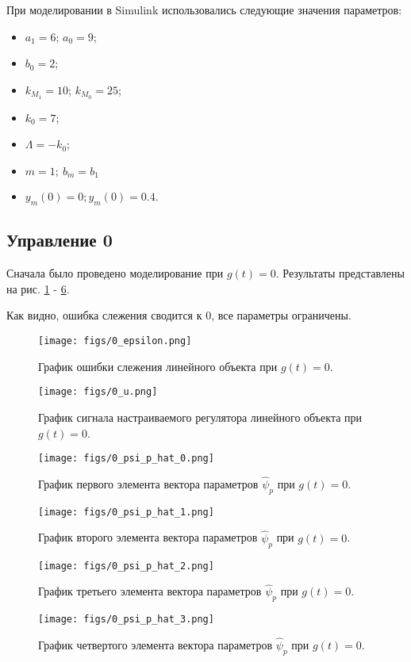 \documentclass{article}
\begin{document}
При моделировании в Simulink использовались следующие значения параметров: 
\begin{itemize}
  \item \(a_1 = 6\); \(a_0 = 9\);
  \item \(b_0 = 2\);
  \item \(k_{M_1} = 10\); \(k_{M_0} = 25\);
  \item \(k_0 = 7\);
  \item \(\Lambda = -k_0\);
  \item \(m = 1; ~ b_m = b_1\)
  \item \(y_m(0) = 0; y_m(0) = 0.4\).
\end{itemize}

\newpage
\subsection{Управление 0}
Сначала было проведено моделирование при \(g(t) = 0\). 
Результаты представлены на рис. \ref{fig:1_epsilon} - \ref{fig:1_psi0_psi_p_hat_3}.

Как видно, ошибка слежения сводится к 0, все параметры ограничены.
\begin{figure}[h!]
  \centering
  \texttt{[image: figs/0\_epsilon.png]}
  \caption{График ошибки слежения линейного объекта при \(g(t) = 0\).} 
  \label{fig:1_epsilon}
\end{figure}
\begin{figure}[h!]
  \centering
  \texttt{[image: figs/0\_u.png]}
  \caption{График сигнала настраиваемого регулятора линейного объекта при \(g(t) = 0\).} 
  \label{fig:1_u}
\end{figure}
\begin{figure}[h!]
  \centering
  \texttt{[image: figs/0\_psi\_p\_hat\_0.png]}
  \caption{График первого элемента вектора параметров \(\hat{\psi}_p\) при \(g(t) = 0\).} 
  \label{fig:1_psi0_psi_p_hat_0}
\end{figure}
\begin{figure}[h!]
  \centering
  \texttt{[image: figs/0\_psi\_p\_hat\_1.png]}
  \caption{График второго элемента вектора параметров \(\hat{\psi}_p\) при \(g(t) = 0\).} 
  \label{fig:1_psi0_psi_p_hat_1}
\end{figure}
\begin{figure}[h!]
  \centering
  \texttt{[image: figs/0\_psi\_p\_hat\_2.png]}
  \caption{График третьего элемента вектора параметров \(\hat{\psi}_p\) при \(g(t) = 0\).} 
  \label{fig:1_psi0_psi_p_hat_2}
\end{figure}
\begin{figure}[h!]
  \centering
  \texttt{[image: figs/0\_psi\_p\_hat\_3.png]}
  \caption{График четвертого элемента вектора параметров \(\hat{\psi}_p\) при \(g(t) = 0\).} 
  \label{fig:1_psi0_psi_p_hat_3}
\end{figure}
\FloatBarrier
\newpage
\end{document}
